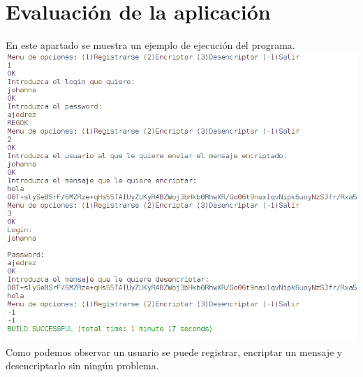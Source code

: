 \documentclass[11pt]{article}
\begin{document}
\newpage
\section{Evaluaci\'on de la aplicaci\'on}
En este apartado se muestra un ejemplo de ejecuci\'on del programa.
\\ 

\includegraphics[width=16cm]{captura}
Como podemos observar un usuario se puede registrar, encriptar un mensaje y desencriptarlo sin ning\'un problema.
\end{document}
